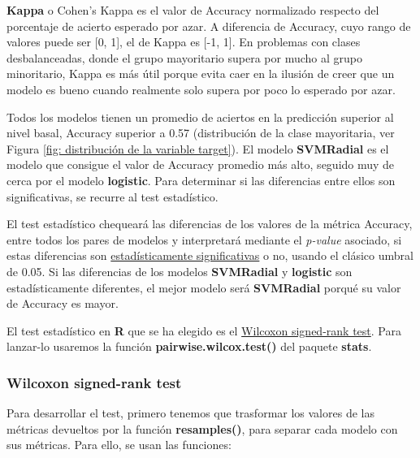 \documentclass[]{article}
\begin{document}
\begin{tcolorbox}
	\textbf{Kappa} o Cohen's Kappa es el valor de Accuracy normalizado respecto
	del porcentaje de acierto esperado por azar. A diferencia de Accuracy,
	cuyo rango de valores puede ser {[}0, 1{]}, el de Kappa es {[}-1, 1{]}.
	En problemas con clases desbalanceadas, donde el grupo mayoritario
	supera por mucho al grupo minoritario, Kappa es más útil porque evita caer en la
	ilusión de creer que un modelo es bueno cuando realmente solo supera por
	poco lo esperado por azar.
\end{tcolorbox}

Todos los modelos tienen un promedio de aciertos en la predicción
superior al nivel basal, Accuracy superior a 0.57 (distribución de la clase mayoritaria, ver Figura \ref{fig: distribución de la variable target}). El modelo \textbf{SVMRadial} es el modelo que consigue el valor de Accuracy promedio más alto, seguido muy de cerca por el modelo \textbf{logistic}. Para determinar si
las diferencias entre ellos son significativas, se recurre al {test estadístico}. 

El test estadístico chequeará las diferencias de los valores de la métrica Accuracy, entre todos los pares de
modelos y interpretará mediante el \emph{p-value} asociado, si estas diferencias son \href{https://en.wikipedia.org/wiki/Statistical_significance}{\color{blue}estadísticamente significativas} o no, usando el clásico umbral de 0.05. Si las diferencias de los modelos \textbf{SVMRadial} y \textbf{logistic} son estadísticamente diferentes, el mejor modelo será \textbf{SVMRadial} porqué su valor de Accuracy es mayor.

El test estadístico en \textbf{R} que se ha elegido es el
\href{https://www.cienciadedatos.net/documentos/18_prueba_de_los_rangos_con_signo_de_wilcoxon}{\color{blue}Wilcoxon signed-rank test}. Para lanzar-lo usaremos la función \textbf{pairwise.wilcox.test()} del paquete \textbf{stats}. 

\hypertarget{wilcoxon-signed-rank-test}{%
\subsubsection{Wilcoxon signed-rank
test}\label{wilcoxon-signed-rank-test}}

Para desarrollar el test, primero tenemos que trasformar los valores de las métricas devueltos por la función \textbf{resamples()}, para separar cada modelo con sus métricas. Para ello, se usan las funciones:
\end{document}

